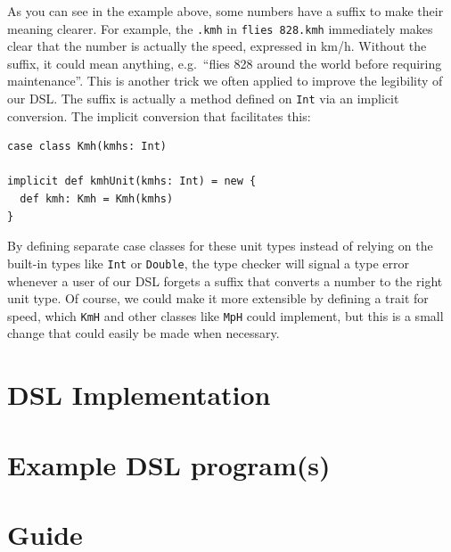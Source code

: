 \documentclass[a4paper]{article}
\newcommand{\cc}[1]{\texttt{#1}}
\renewcommand{\sc}[1]{\lstinline{#1}}
\begin{document}
As you can see in the example above, some numbers have a suffix to make their meaning clearer.
For example, the \sc{.kmh} in \sc{flies 828.kmh} immediately makes clear that the number is actually the speed, expressed in km/h.
Without the suffix, it could mean anything, e.g.\ ``flies 828 around the world before requiring maintenance''.
This is another trick we often applied to improve the legibility of our DSL.
The suffix is actually a method defined on \cc{Int} via an implicit conversion.
The implicit conversion that facilitates this:
\begin{lstlisting}
case class Kmh(kmhs: Int)

implicit def kmhUnit(kmhs: Int) = new {
  def kmh: Kmh = Kmh(kmhs)
}
\end{lstlisting}

By defining separate case classes for these unit types instead of relying on the built-in types like \cc{Int} or \cc{Double}, the type checker will signal a type error whenever a user of our DSL forgets a suffix that converts a number to the right unit type.
Of course, we could make it more extensible by defining a trait for speed, which \cc{KmH} and other classes like \cc{MpH} could implement, but this is a small change that could easily be made when necessary.



\section{DSL Implementation}
\label{sec:dsl-implementation}


\section{Example DSL program(s)}
\label{sec:example-dsl-programs}


\section{Guide}
\label{sec:guide}

\end{document}

